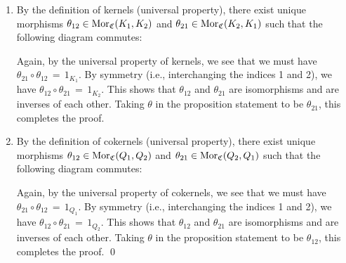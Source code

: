 \begin{enumerate}
\item
	By the definition of kernels (universal property), there exist unique morphisms
	$\theta_{12} \in \textnormal{Mor}_{\mathfrak{C}}(K_{1},K_{2})$ and $\theta_{21} \in \textnormal{Mor}_{\mathfrak{C}}(K_{2},K_{1})$
	such that the following diagram commutes:
	\begin{center}
	\end{center}
	Again, by the universal property of kernels, we see that we must have
	$\theta_{21} \circ \theta_{12} \,=\, 1_{K_{1}}$.
	By symmetry (i.e., interchanging the indices 1 and 2), we have $\theta_{12} \circ \theta_{21} \,=\, 1_{K_{2}}$.
	This shows that $\theta_{12}$ and $\theta_{21}$ are isomorphisms and are inverses of each other.
	Taking $\theta$ in the proposition statement to be $\theta_{21}$, this completes the proof.
\item
	By the definition of cokernels (universal property), there exist unique morphisms
	$\theta_{12} \in \textnormal{Mor}_{\mathfrak{C}}(Q_{1},Q_{2})$ and $\theta_{21} \in \textnormal{Mor}_{\mathfrak{C}}(Q_{2},Q_{1})$
	such that the following diagram commutes:
	\begin{center}
	\end{center}
	Again, by the universal property of cokernels, we see that we must have
	$\theta_{21} \circ \theta_{12} \,=\, 1_{Q_{1}}$.
	By symmetry (i.e., interchanging the indices 1 and 2), we have $\theta_{12} \circ \theta_{21} \,=\, 1_{Q_{2}}$.
	This shows that $\theta_{12}$ and $\theta_{21}$ are isomorphisms and are inverses of each other.
	Taking $\theta$ in the proposition statement to be $\theta_{12}$, this completes the proof.
	\qed
\end{enumerate}

